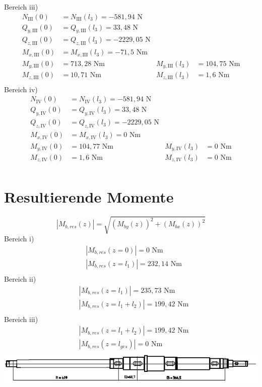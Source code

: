 Bereich iii)
\begin{align*}
	N_{\mathrm{III}} (0) &= N_{\mathrm{III}} (l_3) = -581,94 \text{ N}\\
	Q_{y,\mathrm{III}} (0) &= Q_{y,\mathrm{III}} (l_3) = 33,48\text{ N}\\
	Q_{z,\mathrm{III}} (0) &= Q_{z,\mathrm{III}} (l_3) = -2229,05\text{ N}\\
	M_{x,\mathrm{III}} (0) &= M_{x,\mathrm{III}} (l_3) = -71,5\text{ Nm}\\
	M_{y,\mathrm{III}} (0) &=  713,28\text{ Nm} & M_{y,\mathrm{III}} (l_3) &= 104,75\text{ Nm}\\
	M_{z,\mathrm{III}} (0) &= 10,71\text{ Nm} &M_{z,\mathrm{III}} (l_3) &= 1,6\text{ Nm}\\
\end{align*}
Bereich iv)
\begin{align*}
	N_{\mathrm{IV}} (0) &= N_{\mathrm{IV}} (l_3) = -581,94 \text{ N}\\
	Q_{y,\mathrm{IV}} (0) &= Q_{y,\mathrm{IV}} (l_3) = 33,48\text{ N}\\
	Q_{z,\mathrm{IV}} (0) &= Q_{z,\mathrm{IV}} (l_3) = -2229,05\text{ N}\\
	M_{x,\mathrm{IV}} (0) &= M_{x,\mathrm{IV}} (l_3) = 0\text{ Nm}\\
	M_{y,\mathrm{IV}} (0) &=  104,77\text{ Nm} & M_{y,\mathrm{IV}} (l_3) &= 0\text{ Nm}\\
	M_{z,\mathrm{IV}} (0) &= 1,6\text{ Nm} &M_{z,\mathrm{IV}} (l_3) &= 0\text{ Nm}\\
\end{align*}
\newpage
\section{Resultierende Momente}
\[
	|M_{b,res}(z)| = \sqrt{\left( M_{by}(z) \right)^2 + \left( M_{bx}(z) \right)^2 }
\]
Bereich i)
\begin{align*}
	&|M_{b,res}(z=0)| = 0 \text{ Nm} \\
	&|M_{b,res}(z=l_1)| = 232,14 \text{ Nm} \\
\end{align*}
Bereich ii)
\begin{align*}
	&|M_{b,res}(z=l_1)| = 235,73 \text{ Nm} \\
	&|M_{b,res}(z=l_1+l_2)| = 199,42 \text{ Nm} \\
\end{align*}
Bereich iii)
\begin{align*}
	&|M_{b,res}(z=l_1+l_2)| = 199,42 \text{ Nm} \\
	&|M_{b,res}(z=l_{ges})| = 0 \text{ Nm} \\
\end{align*}
\includegraphics[width=\textwidth,keepaspectratio]{figures/Welle1klein.png}